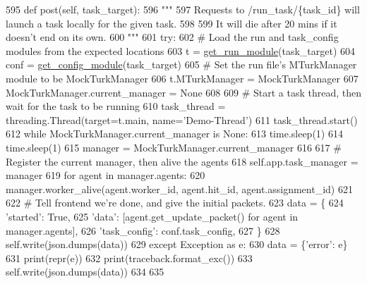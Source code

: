 \begin{DoxyCode}
595     \textcolor{keyword}{def }post(self, task\_target):
596         \textcolor{stringliteral}{"""}
597 \textcolor{stringliteral}{        Requests to /run\_task/\{task\_id\} will launch a task locally for the given task.}
598 \textcolor{stringliteral}{}
599 \textcolor{stringliteral}{        It will die after 20 mins if it doesn't end on its own.}
600 \textcolor{stringliteral}{        """}
601         \textcolor{keywordflow}{try}:
602             \textcolor{comment}{# Load the run and task\_config modules from the expected locations}
603             t = \hyperlink{namespaceparlai_1_1mturk_1_1webapp_1_1server_a49eb9835228f9f47f9aa55bc6369c23f}{get\_run\_module}(task\_target)
604             conf = \hyperlink{namespaceparlai_1_1mturk_1_1webapp_1_1server_aee065cfdb6346d4815762ae793427f1e}{get\_config\_module}(task\_target)
605             \textcolor{comment}{# Set the run file's MTurkManager module to be MockTurkManager}
606             t.MTurkManager = MockTurkManager
607             MockTurkManager.current\_manager = \textcolor{keywordtype}{None}
608 
609             \textcolor{comment}{# Start a task thread, then wait for the task to be running}
610             task\_thread = threading.Thread(target=t.main, name=\textcolor{stringliteral}{'Demo-Thread'})
611             task\_thread.start()
612             \textcolor{keywordflow}{while} MockTurkManager.current\_manager \textcolor{keywordflow}{is} \textcolor{keywordtype}{None}:
613                 time.sleep(1)
614             time.sleep(1)
615             manager = MockTurkManager.current\_manager
616 
617             \textcolor{comment}{# Register the current manager, then alive the agents}
618             self.app.task\_manager = manager
619             \textcolor{keywordflow}{for} agent \textcolor{keywordflow}{in} manager.agents:
620                 manager.worker\_alive(agent.worker\_id, agent.hit\_id, agent.assignment\_id)
621 
622             \textcolor{comment}{# Tell frontend we're done, and give the initial packets.}
623             data = \{
624                 \textcolor{stringliteral}{'started'}: \textcolor{keyword}{True},
625                 \textcolor{stringliteral}{'data'}: [agent.get\_update\_packet() \textcolor{keywordflow}{for} agent \textcolor{keywordflow}{in} manager.agents],
626                 \textcolor{stringliteral}{'task\_config'}: conf.task\_config,
627             \}
628             self.write(json.dumps(data))
629         \textcolor{keywordflow}{except} Exception \textcolor{keyword}{as} e:
630             data = \{\textcolor{stringliteral}{'error'}: e\}
631             print(repr(e))
632             print(traceback.format\_exc())
633             self.write(json.dumps(data))
634 
635 
\end{DoxyCode}


